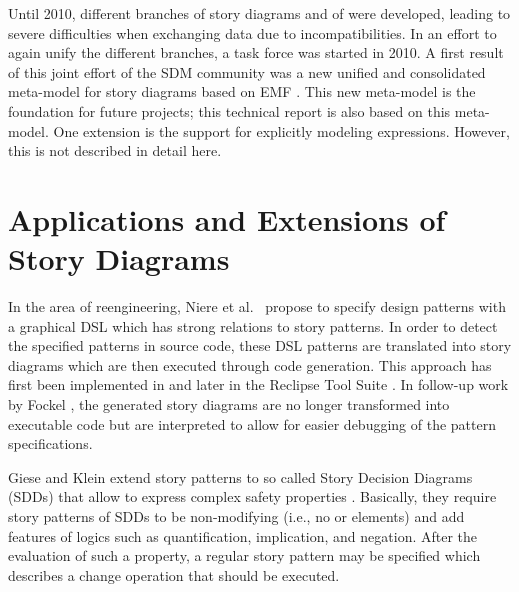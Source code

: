 Until 2010, different branches of story diagrams and of \fuj were developed, leading to severe difficulties when exchanging data due to incompatibilities.
In an effort to again unify the different branches, a task force was started in 2010.
A first result of this joint effort of the SDM community was a new unified and consolidated meta-model for story diagrams based on EMF \cite{HRvD+11}.
This new meta-model is the foundation for future projects; this technical report is also based on this meta-model.
One extension is the support for explicitly modeling expressions.
However, this is not described in detail here.













\section{Applications and Extensions of Story Diagrams}
\label{sec:RW_Extensions}

In the area of reengineering, Niere et al.\ \cite{NSW+02} propose to specify design patterns with a graphical DSL which has strong relations to story patterns. In order to detect the specified patterns in source code, these DSL patterns are translated into story diagrams which are then executed through code generation. This approach has first been implemented in \fuj and later in the Reclipse Tool Suite \cite{DMT10}. In follow-up work by Fockel \cite{Foc10}, the generated story diagrams are no longer transformed into executable code but are interpreted to allow for easier debugging of the pattern specifications.

Giese and Klein extend story patterns to so called Story Decision Diagrams (SDDs) that allow to express complex safety properties \cite{GK06a}.
Basically, they require story patterns of SDDs to be non-modifying (i.e., no \create or \destroy elements) and add features of logics such as quantification, implication, and negation.
After the evaluation of such a property, a regular story pattern may be specified which describes a change operation that should be executed.

